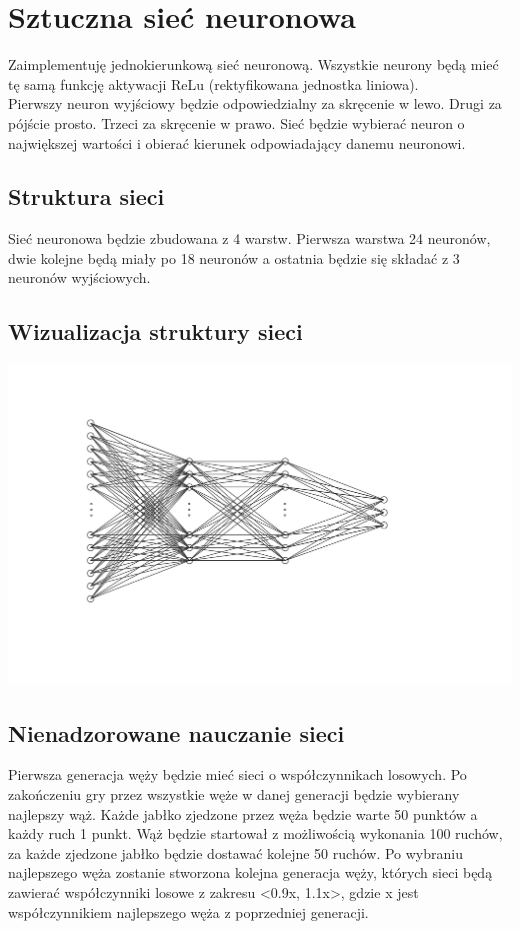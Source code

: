 \documentclass[12pt]{article}
\begin{document}
	\section{Sztuczna sieć neuronowa}
		Zaimplementuję jednokierunkową sieć neuronową. Wszystkie neurony będą mieć tę samą funkcję aktywacji ReLu (rektyfikowana jednostka liniowa). 
		\\
		Pierwszy neuron wyjściowy będzie odpowiedzialny za skręcenie w lewo. Drugi za pójście prosto. Trzeci za skręcenie w prawo. Sieć będzie wybierać neuron o największej wartości i obierać kierunek odpowiadający danemu neuronowi.
		\subsection{Struktura sieci}
			Sieć neuronowa będzie zbudowana z 4 warstw. Pierwsza warstwa 24 neuronów, dwie kolejne będą miały po 18 neuronów a ostatnia będzie się składać z 3 neuronów wyjściowych.
		\subsection{Wizualizacja struktury sieci}	
			\includegraphics[width=\textwidth]{siec.png}
		\subsection{Nienadzorowane nauczanie sieci}
			Pierwsza generacja węży będzie mieć sieci o współczynnikach losowych. Po zakończeniu gry przez wszystkie węże w danej generacji będzie wybierany najlepszy wąż. Każde jabłko zjedzone przez węża będzie warte 50 punktów a każdy ruch 1 punkt. Wąż będzie startował z możliwością wykonania 100 ruchów, za każde zjedzone jabłko będzie dostawać kolejne 50 ruchów. Po wybraniu najlepszego węża zostanie stworzona kolejna generacja węży, których sieci będą zawierać współczynniki losowe z zakresu \textless 0.9x, 1.1x\textgreater, gdzie x jest współczynnikiem najlepszego węża z poprzedniej generacji. 
	
\end{document}
